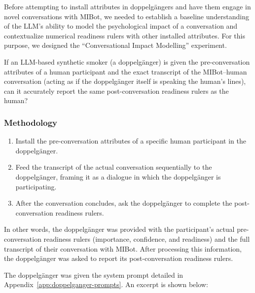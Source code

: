 Before attempting to install attributes in doppelgängers and have them engage in novel conversations with MIBot, we needed to establish a baseline understanding of the LLM's ability to model the psychological impact of a conversation and contextualize numerical readiness rulers with other installed attributes. For this purpose, we designed the ``Conversational Impact Modelling'' experiment.

If an LLM-based synthetic smoker (a doppelgänger) is given the pre-conversation attributes of a human participant and the exact transcript of the MIBot--human conversation (acting as if the doppelgänger itself is speaking the human's lines), can it accurately report the same post-conversation readiness rulers as the human?

\subsubsection{Methodology}
\begin{enumerate}
    \item Install the pre-conversation attributes of a specific human participant in the doppelgänger.
    \item Feed the transcript of the actual conversation sequentially to the doppelgänger, framing it as a dialogue in which the doppelgänger is participating.
    \item After the conversation concludes, ask the doppelgänger to complete the post-conversation readiness rulers.
\end{enumerate}

In other words, the doppelgänger was provided with the participant's actual pre-conversation readiness rulers (importance, confidence, and readiness) and the full transcript of their conversation with MIBot. After processing this information, the doppelgänger was asked to report its post-conversation readiness rulers.

The doppelgänger was given the system prompt detailed in Appendix~\ref{app:doppelganger-prompts}. An excerpt is shown below:


